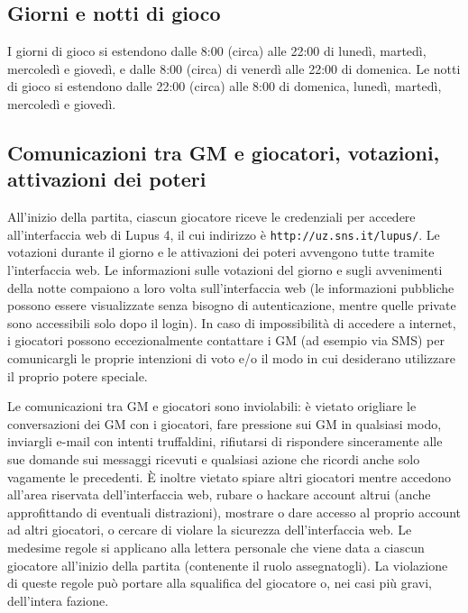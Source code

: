 \documentclass[a4paper,10pt]{article}
\begin{document}
\subsection{Giorni e notti di gioco}

I giorni di gioco si estendono dalle 8:00 (circa) alle 22:00 di lunedì, martedì, mercoledì e giovedì, e dalle 8:00 (circa) di venerdì alle 22:00 di domenica.
Le notti di gioco si estendono dalle 22:00 (circa) alle 8:00 di domenica, lunedì, martedì, mercoledì e giovedì.



\subsection{Comunicazioni tra GM e giocatori, votazioni, attivazioni dei poteri}

All'inizio della partita, ciascun giocatore riceve le credenziali per accedere all'interfaccia web di Lupus 4, il cui indirizzo è \verb|http://uz.sns.it/lupus/|.
Le votazioni durante il giorno e le attivazioni dei poteri avvengono tutte tramite l'interfaccia web. Le informazioni sulle votazioni del giorno e sugli avvenimenti della notte compaiono a loro volta sull'interfaccia web (le informazioni pubbliche possono essere visualizzate senza bisogno di autenticazione, mentre quelle private sono accessibili solo dopo il login).
In caso di impossibilità di accedere a internet, i giocatori possono eccezionalmente contattare i GM (ad esempio via SMS) per comunicargli le proprie intenzioni di voto e/o il modo in cui desiderano utilizzare il proprio potere speciale.

Le comunicazioni tra GM e giocatori sono inviolabili: è vietato origliare le conversazioni dei GM con i giocatori, fare pressione sui GM in qualsiasi modo, inviargli e-mail con intenti truffaldini, rifiutarsi di rispondere sinceramente alle sue domande sui messaggi ricevuti e qualsiasi azione che ricordi anche solo vagamente le precedenti.
È inoltre vietato spiare altri giocatori mentre accedono all'area riservata dell'interfaccia web, rubare o hackare account altrui (anche approfittando di eventuali distrazioni), mostrare o dare accesso al proprio account ad altri giocatori, o cercare di violare la sicurezza dell'interfaccia web.
Le medesime regole si applicano alla lettera personale che viene data a ciascun giocatore all'inizio della partita (contenente il ruolo assegnatogli).
La violazione di queste regole può portare alla squalifica del giocatore o, nei casi più gravi, dell'intera fazione.
\end{document}
